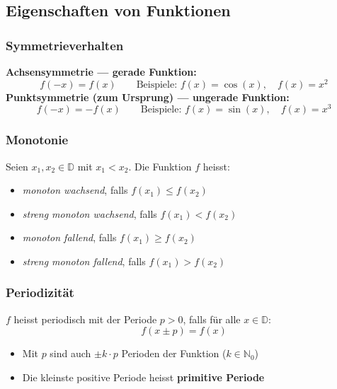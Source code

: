 \documentclass[../zusammenfassung_AN.tex]{subfiles}
\begin{document}
	
	\subsection{Eigenschaften von Funktionen}
	
	\subsubsection{Symmetrieverhalten}
	
	\begin{tcolorbox}[dglbox, title={Symmetrie}]
		\textbf{Achsensymmetrie — gerade Funktion:}
		\[
		f(-x) = f(x)
		\qquad \text{Beispiele: } f(x)=\cos(x),\quad f(x)=x^2
		\]
		\textbf{Punktsymmetrie (zum Ursprung) — ungerade Funktion:}
		\[
		f(-x) = -f(x)
		\qquad \text{Beispiele: } f(x)=\sin(x),\quad f(x)=x^3
		\]
	\end{tcolorbox}
	
	\subsubsection{Monotonie}
	
	\begin{tcolorbox}[formelbox]
		Seien $x_1, x_2 \in \mathbb{D}$ mit $x_1 < x_2$. Die Funktion $f$ heisst:
		\begin{itemize}[noitemsep]
			\item \textit{monoton wachsend}, falls $f(x_1) \le f(x_2)$
			\item \textit{streng monoton wachsend}, falls $f(x_1) < f(x_2)$
			\item \textit{monoton fallend}, falls $f(x_1) \ge f(x_2)$
			\item \textit{streng monoton fallend}, falls $f(x_1) > f(x_2)$
		\end{itemize}
	\end{tcolorbox}
	
	\subsubsection{Periodizität}
	
	\begin{tcolorbox}[formelbox]
		$f$ heisst periodisch mit der Periode $p > 0$, falls für alle $x \in \mathbb{D}$:
		\[
		f(x \pm p) = f(x)
		\]
	\end{tcolorbox}
	
	\begin{itemize}[noitemsep]
		\item Mit $p$ sind auch $\pm k\cdot p$ Perioden der Funktion ($k \in \mathbb{N}_0$)
		\item Die kleinste positive Periode heisst \textbf{primitive Periode}
	\end{itemize}
	
\end{document}
